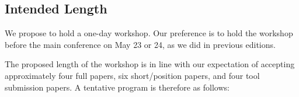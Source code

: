 \documentclass[sigconf,review]{acmart}
\newcommand{\TODO}[1]{\textbf{\textcolor{ScarletRed}{[TODO: #1]}}\xspace}
\newcommand{\TODO}[1]{}
\begin{document}
\subsection{Intended Length} We propose to hold a one-day workshop. 
Our preference is to hold the workshop before the main
conference on May 23 or 24, as we did in previous editions.

The proposed length of the workshop is in line with our expectation of
accepting approximately four full papers, six short/position papers,
and four tool submission papers.
A tentative program is therefore as follows:

\vspace{0.05in}

{\small
{}}	

\end{document}
